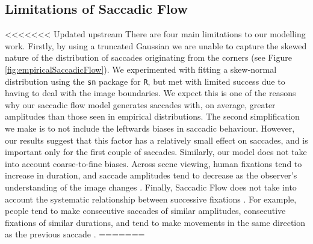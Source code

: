 \documentclass[a4paper, twocolumn, oneside, 11pt]{article}
\begin{document}
\subsection{Limitations of Saccadic Flow}
<<<<<<< Updated upstream
There are four main limitations to our modelling work. Firstly, by using a truncated Gaussian we are unable to capture the skewed nature of the distribution of saccades originating from the corners (see Figure  \ref{fig:empiricalSaccadicFlow}). We experimented with fitting a skew-normal distribution using the \texttt{sn} package for \texttt{R}, but met with limited success due to having to deal with the image boundaries. We expect this is one of the reasons why our saccadic flow model generates saccades with, on average, greater amplitudes than those seen in empirical distributions.  The second simplification we make is to not include the leftwards biases in saccadic behaviour. However, our results suggest that this factor has a relatively small effect on saccades, and is important only for the first couple of saccades. Similarly, our model does not take into account coarse-to-fine biases. Across scene viewing, human fixations tend to increase in duration, and saccade amplitudes tend to decrease as the observer's understanding of the image changes \citep{antes1974}. Finally, Saccadic Flow does not take into account the systematic relationship between successive fixations \citep{tatler2008}. For example, people tend to make consecutive saccades of similar amplitudes, consecutive fixations of similar durations, and tend to make movements in the same direction as the previous saccade \citep{macinnes2014}.
=======
\end{document}
